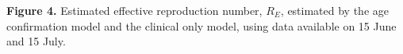 \textbf{Figure 4.} Estimated effective reproduction number, $R_E$, estimated by the age confirmation model and the clinical only model, using data available on 15 June and 15 July.